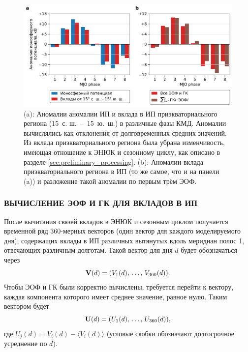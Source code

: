 \begin{figure}[htbp]
    \centering
    \includegraphics[width=\textwidth]{figures/equatorial_variation.pdf}
    \caption{(a): Аномалии аномалии ИП и вклада в ИП приэкваториального региона (15\textdegree\ с. ш.~--~15\textdegree~ю.~ш.) в различные фазы КМД. Аномалии вычислялись как отклонения от долговременных средних значений. Из вклада приэкваториального региона была убрана изменчивость, имеющая отношение к ЭНЮК и сезонному циклу, как описано в разделе \ref{sec:preliminary_processing}. (b): Аномалии вклада приэкваториального региона в ИП (то же самое, что и на панели (a)) и разложение такой аномалии по первым трём ЭОФ.}
    \label{fig:eq_var}
\end{figure}

\subsubsection{ВЫЧИСЛЕНИЕ ЭОФ И ГК ДЛЯ ВКЛАДОВ В ИП}

После вычитания связей вкладов в ЭНЮК и сезонным циклом получается временной ряд 360-мерных векторов (один вектор для каждого моделируемого дня), содержащих вклады в ИП различных вытянутых вдоль меридиан полос 1\textdegree{}\textdegree, отвечающих различным долготам. Такой вектор для дня $d$ будет обозначаться через
\begin{equation}
    \vb{V}(d) = \qty(V_1(d),\, \ldots,\, V_{360}(d)).
\end{equation}
Чтобы ЭОФ и ГК были корректно вычислены, требуется перейти к вектору, каждая компонента которого имеет среднее значение, равное нулю. Таким вектором будет 
\begin{equation}
    \vb{U}(d) = \qty(U_1(d),\, \ldots,\, U_{360}(d)),
\end{equation}
где $U_j(d) = V_i(d) - \langle V_i(d) \rangle$ (угловые скобки обозначают долгосрочное усреднение по $d$).

